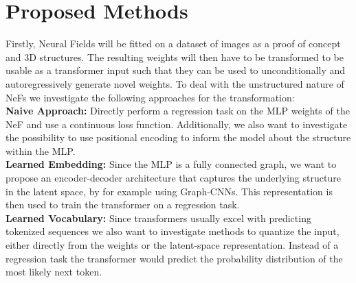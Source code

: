 \section{Proposed Methods}
\label{sec:method}
Firstly, Neural Fields will be fitted on a dataset of images as a proof of concept and 3D structures. The resulting weights will then have to be transformed to be usable as a transformer input such that they can be used to unconditionally and autoregressively generate novel weights. To deal with the unstructured nature of NeFs we investigate the following approaches for the transformation:\\
\noindent \textbf{Naive Approach: }
Directly perform a regression task on the MLP weights of the NeF and use a continuous loss function.
Additionally, we also want to investigate the possibility to use positional encoding to inform the model about the structure within the MLP.
\\
\textbf{Learned Embedding: }
Since the MLP is a fully connected graph, we want to propose an encoder-decoder architecture that captures the underlying structure in the latent space, by for example using Graph-CNNs. This representation is then used to train the transformer on a regression task.
\\
\textbf{Learned Vocabulary: }
Since transformers usually excel with predicting tokenized sequences we also want to investigate methods to quantize the input, either directly from the weights or the latent-space representation. Instead of a regression task the transformer would predict the probability distribution of the most likely next token.

